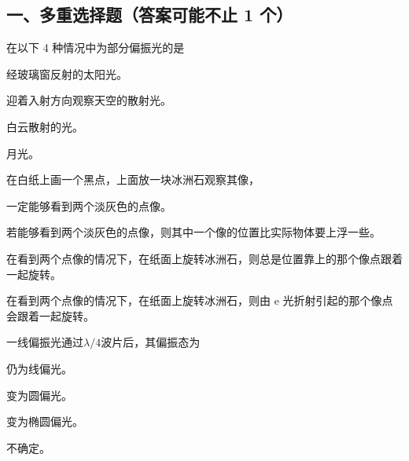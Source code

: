\documentclass[standard, analysis, notocnum]{ExBook}
\newcommand{\answerarea}[1][8cm]{%
  \par\vspace{2mm}%
  \noindent{\color{themeColor!35}\rule{\linewidth}{0.4pt}}\par
  \noindent\begin{minipage}[t][#1][t]{\linewidth}\vspace{0pt}\end{minipage}\par
  \noindent{\color{themeColor!35}\rule{\linewidth}{0.4pt}}\par
}
\begin{document}
\subsection{一、多重选择题（答案可能不止 1 个）}
\begin{qitems}
\begin{bbox}
\qitem 在以下 4 种情况中为部分偏振光的是
\par\noindent\hspace{2em}经玻璃窗反射的太阳光。
\par\noindent\hspace{2em}迎着入射方向观察天空的散射光。
\par\noindent\hspace{2em}白云散射的光。
\par\noindent\hspace{2em}月光。
\answerarea[3.5cm]
\end{bbox}
\begin{bbox}
\qitem 在白纸上画一个黑点，上面放一块冰洲石观察其像，
\par\noindent\hspace{2em}一定能够看到两个淡灰色的点像。
\par\noindent\hspace{2em}若能够看到两个淡灰色的点像，则其中一个像的位置比实际物体要上浮一些。
\par\noindent\hspace{2em}在看到两个点像的情况下，在纸面上旋转冰洲石，则总是位置靠上的那个像点跟着一起旋转。
\par\noindent\hspace{2em}在看到两个点像的情况下，在纸面上旋转冰洲石，则由 e 光折射引起的那个像点会跟着一起旋转。
\answerarea[3.5cm]
\end{bbox}
\begin{bbox}
\qitem 一线偏振光通过$\lambda /4$波片后，其偏振态为
\par\noindent\hspace{2em}仍为线偏光。
\par\noindent\hspace{2em}变为圆偏光。
\par\noindent\hspace{2em}变为椭圆偏光。
\par\noindent\hspace{2em}不确定。
\answerarea[3.5cm]
\end{bbox}
\begin{bbox}

\end{bbox}
\end{qitems}
\end{document}
